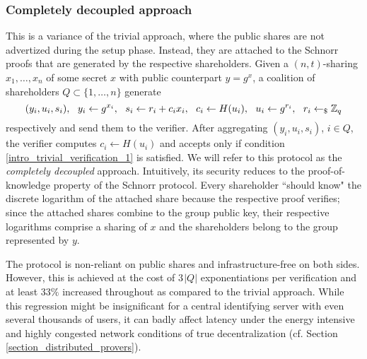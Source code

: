 \documentclass[psamsfonts, reqno]{amsart}
\theoremstyle{definition}
\theoremstyle{remark}
\numberwithin{equation}{section}
\begin{document}
\subsubsection{Completely decoupled approach}\label{section_decoupled_commitment}

This is a variance of the trivial approach,
where the public shares
are not advertized during the setup phase.
Instead, they are attached to the
Schnorr proofs that are generated
by the respective shareholders.
Given a $(n, t)$-sharing
$x_1, \dots, x_n$ of some secret $x$
with public counterpart $y =  g^x$,
a coalition of shareholders
$Q \subset \{1, \dots, n\}$
generate
\vspace{5pt}
\begin{equation*}
(y_i, u_i, s_i),
\ \ y_i \leftarrow g ^ {x_i},
\ \ s_i \leftarrow r_i + c_i x_i,
\ \ c_i \leftarrow H(u_i),
\ \ u_i \leftarrow g ^ {r_i},
\ \ r_i \leftarrow_\$ \mathbb{Z}_q
\vspace{5pt}
\end{equation*}
respectively
and send them to the verifier.
After aggregating
$(y_i, u_i, s_i)$, $i \in Q$,
the verifier computes $c_i \leftarrow H(u_i)$
and accepts only if condition
\eqref{intro_trivial_verification_1}
is satisfied.
We will refer to this protocol as the
\textit{completely decoupled} approach.
Intuitively, its security reduces to the proof-of-knowledge
property of the Schnorr protocol.
Every shareholder ``should know"
the discrete logarithm of the attached share
because the respective proof verifies;
since the attached shares combine to the group public key,
their respective logarithms comprise a sharing of
$x$ and the shareholders belong to the group
represented by $y$.

The protocol is non-reliant on public shares and
infrastructure-free on both sides.
However, this is achieved at the cost of
$3\hspace{1pt}|Q|$ exponentiations per verification
and at least $33\%$ increased throughout
as compared to the trivial approach.
While this regression might be insignificant
for a central identifying server
with even several thousands of users,
it can badly affect latency under
the energy intensive and
highly congested network conditions
of true decentralization
(cf. Section \ref{section_distributed_provers}).
\end{document}
